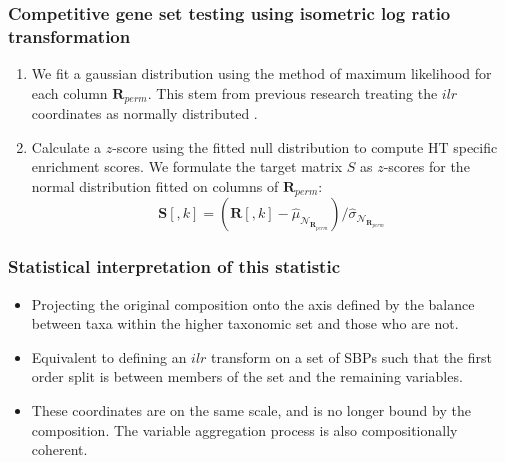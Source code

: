 \documentclass{beamer}
\begin{document}
\begin{frame}
    \frametitle{Competitive gene set testing using isometric log ratio transformation}
    \begin{enumerate}
        \item We fit a gaussian distribution using the method of maximum likelihood for each column $\bm{R}_{perm}$. This stem from previous research treating the $ilr$ coordinates as normally distributed \cite{egozcue2005}.  
        \item Calculate a $z$-score using the fitted null distribution to compute HT specific enrichment scores. We formulate the target matrix $S$ as $z$-scores for the normal distribution fitted on columns of $\bm{R}_{perm}$:
        \begin{equation}
            \bm{S}[,k] = (\bm{R}[,k] - \hat{\mu}_{\mathcal{N}_{\bm{R}_{perm}}})/\hat{\sigma}_{\mathcal{N}_{\bm{R}_{perm}}}
        \end{equation}
    \end{enumerate}
\end{frame}

\begin{frame}
    \frametitle{Statistical interpretation of this statistic}
    \begin{itemize}
        \item Projecting the original composition onto the axis defined by the balance between taxa within the higher taxonomic set and those who are not. 
        \item Equivalent to defining an $ilr$ transform on a set of SBPs such that the first order split is between members of the set and the remaining variables. 
        \item These coordinates are on the same scale, and is no longer bound by the composition. The variable aggregation process is also compositionally coherent.   
    \end{itemize}
\end{frame}
\end{document}
